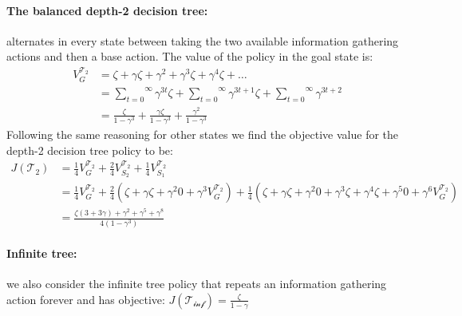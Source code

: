 \paragraph{The balanced depth-2 decision tree:}alternates in every state between taking the two available information gathering actions and then a base action.
The value of the policy in the goal state is:
\begin{align*}
    V^{\mathcal{T}_2}_{G} &= \zeta + \gamma\zeta + \gamma^2 + \gamma^3\zeta + \gamma^4\zeta + \dots \\
    &= \overset{\infty}{\underset{t=0}\sum} \gamma^{3t}\zeta + \overset{\infty}{\underset{t=0}\sum} \gamma^{3t+1}\zeta + \overset{\infty}{\underset{t=0}\sum} \gamma^{3t+2} \\
    &= \frac{\zeta}{1-\gamma^3} + \frac{\gamma\zeta}{1-\gamma^3} + \frac{\gamma^2}{1-\gamma^3}
\end{align*}
Following the same reasoning for other states we find the objective value for the depth-2 decision tree policy to be:
\begin{align*}
    J(\mathcal{T}_2) &=\frac{1}{4} V^{\mathcal{T}_2}_G + \frac{2}{4} V^{\mathcal{T}_2}_{S_2} + \frac{1}{4} V^{\mathcal{T}_2}_{S_1} \\
    &= \frac{1}{4} V^{\mathcal{T}_2}_G + \frac{2}{4}(\zeta + \gamma\zeta + \gamma^2 0 + \gamma^3V^{\mathcal{T}_2}_G) + \frac{1}{4} (\zeta+\gamma\zeta+\gamma^2 0 + \gamma^3\zeta+\gamma^4\zeta+\gamma^5 0 +\gamma^6 V^{\mathcal{T}_2}_G) \\
    &= \frac{\zeta(3+3\gamma)+\gamma^2+\gamma^5+\gamma^8}{4(1-\gamma^3)}
\end{align*}
\paragraph{Infinite tree:} we also consider the infinite tree policy that repeats an information gathering action forever and has objective: $J(\mathcal{T_{\text{inf}}}) = \frac{\zeta}{1-\gamma}$

